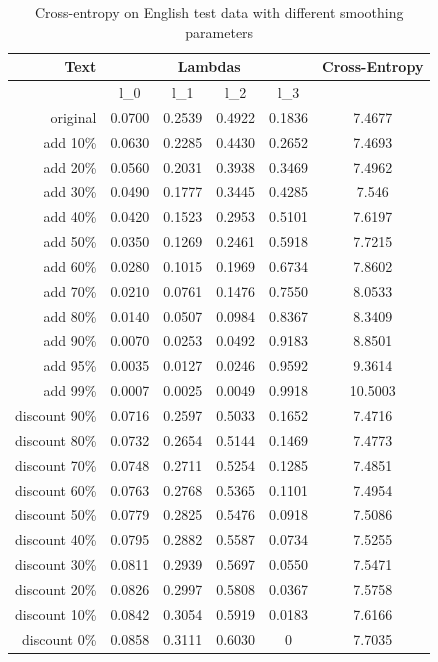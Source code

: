 \documentclass[a4paper]{article}
\begin{document}
\begin{table}[h]
	\centering
	\caption{Cross-entropy on English test data with different smoothing
	parameters}
	\label{tab:ce_en}
	\begin{tabular}{r|cccc|c}
		Text & \multicolumn{4}{|c|}{Lambdas} & Cross-Entropy \\
		\hline
			 & l\_0 & l\_1 & l\_2 & l\_3 & \\
		\hline
		original & 0.0700 & 0.2539 & 0.4922 & 0.1836 & 7.4677\\
		\hline
		add {10\%}  & 0.0630 & 0.2285 & 0.4430 & 0.2652 & 7.4693\\
		add {20\%}  & 0.0560 & 0.2031 & 0.3938 & 0.3469 & 7.4962\\
		add {30\%}  & 0.0490 & 0.1777 & 0.3445 & 0.4285 & 7.546\\
		add {40\%}  & 0.0420 & 0.1523 & 0.2953 & 0.5101 & 7.6197\\
		add {50\%}  & 0.0350 & 0.1269 & 0.2461 & 0.5918 & 7.7215\\
		add {60\%}  & 0.0280 & 0.1015 & 0.1969 & 0.6734 & 7.8602\\
		add {70\%}  & 0.0210 & 0.0761 & 0.1476 & 0.7550 & 8.0533\\
		add {80\%}  & 0.0140 & 0.0507 & 0.0984 & 0.8367 & 8.3409\\
		add {90\%}  & 0.0070 & 0.0253 & 0.0492 & 0.9183 & 8.8501\\
		add {95\%} & 0.0035 & 0.0127 & 0.0246 & 0.9592 & 9.3614\\
		add {99\%} & 0.0007 & 0.0025 & 0.0049 & 0.9918 & 10.5003\\
		\hline
		discount {90\%} & 0.0716 & 0.2597 & 0.5033 & 0.1652 & 7.4716\\
		discount {80\%} & 0.0732 & 0.2654 & 0.5144 & 0.1469 & 7.4773\\
		discount {70\%} & 0.0748 & 0.2711 & 0.5254 & 0.1285 & 7.4851\\
		discount {60\%} & 0.0763 & 0.2768 & 0.5365 & 0.1101 & 7.4954\\
		discount {50\%} & 0.0779 & 0.2825 & 0.5476 & 0.0918 & 7.5086\\
		discount {40\%} & 0.0795 & 0.2882 & 0.5587 & 0.0734 & 7.5255\\
		discount {30\%} & 0.0811 & 0.2939 & 0.5697 & 0.0550 & 7.5471\\
		discount {20\%} & 0.0826 & 0.2997 & 0.5808 & 0.0367 & 7.5758\\
		discount {10\%} & 0.0842 & 0.3054 & 0.5919 & 0.0183 & 7.6166\\
		discount {0\%}  & 0.0858 & 0.3111 & 0.6030 & 0      & 7.7035\\
	\end{tabular}
\end{table}
\end{document}
